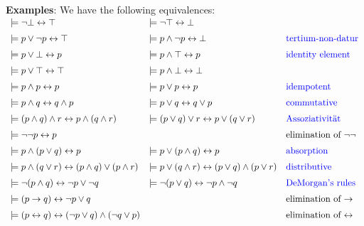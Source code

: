\noindent
\textbf{Examples}:  We have the following equivalences: \\[0.3cm]
\hspace*{0.3cm} 
$\begin{array}{lll}
\models \neg \falsum \leftrightarrow \verum & \models \neg \verum \leftrightarrow \falsum &  \\[0.2cm]
 \models p \vee   \neg p \leftrightarrow \verum & \models p \wedge \neg p \leftrightarrow \falsum & \mbox{\blue{tertium-non-datur}} \\[0.2cm]
 \models p \vee   \falsum \leftrightarrow p & \models p \wedge \verum  \leftrightarrow p & \mbox{\blue{identity element}}\\[0.2cm]
 \models p \vee   \verum  \leftrightarrow \verum & \models p \wedge \falsum \leftrightarrow \falsum &  \\[0.2cm]
 \models p \wedge p \leftrightarrow p  & \models p \vee p \leftrightarrow p &  \mbox{\blue{idempotent}}\index{idempotent} \\[0.2cm]
 \models p \wedge q \leftrightarrow q \wedge p & \models p \vee   q \leftrightarrow q \vee p & \mbox{\blue{commutative}}\index{commutative} \\[0.2cm]
 \models (p \wedge q) \wedge r \leftrightarrow p \wedge (q \wedge r) & \models (p \vee   q) \vee r \leftrightarrow p \vee   (q \vee r)  &
 \mbox{\blue{Assoziativität}}\index{associative} \\[0.2cm]
 \models \neg \neg p \leftrightarrow p & & \mbox{elimination of $\neg \neg$} \\[0.2cm]
 \models p \wedge (p \vee q)   \leftrightarrow p & \models p \vee   (p \wedge q) \leftrightarrow p &  \mbox{\blue{absorption}}\index{absorption} \\[0.2cm]
 \models p \wedge (q \vee r)   \leftrightarrow (p \wedge q) \vee   (p \wedge r) & 
 \models p \vee   (q \wedge r) \leftrightarrow (p \vee q)   \wedge (p \vee   r) & \mbox{\blue{distributive}}\index{distributive} \\[0.2cm]
 \models \neg (p \wedge q) \leftrightarrow  \neg p \vee   \neg q &  \models \neg (p \vee   q) \leftrightarrow  \neg p \wedge \neg q &
 \mbox{\blue{DeMorgan's rules}}\index{DeMorgan rules}  \\[0.2cm]
 \models (p \rightarrow q) \leftrightarrow \neg p \vee q & &  \mbox{elimination of $\rightarrow$} \\[0.2cm]
 \models (p \leftrightarrow q) \leftrightarrow (\neg p \vee q) \wedge (\neg q \vee p) & & \mbox{elimination of $\leftrightarrow$}
\end{array}$ \\[0.3cm]

